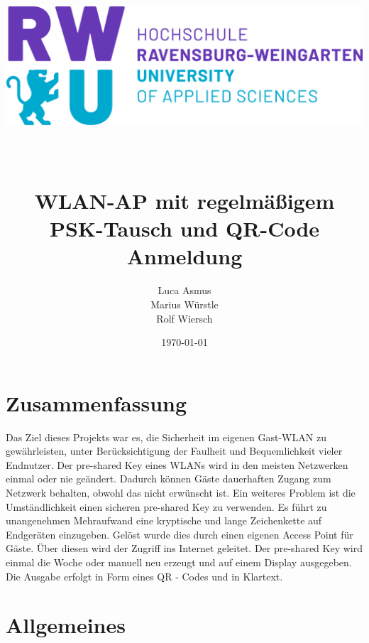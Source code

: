 \documentclass[a4paper,11pt,singlespacing]{article}
\begin{document}
	\setlength{\parindent}{0ex}
	
	\begin{titlepage}
		\author{Luca Asmus\\ Marius Würstle\\Rolf Wiersch}
		\title{\includegraphics[scale=0.3]{rwu_logo_hor-lila-cyan_rgb_0} \\ ~\\ ~\\ WLAN-AP mit regelmäßigem PSK-Tausch und QR-Code Anmeldung \vspace{8cm}}
		\date{\today}
		\maketitle
		\thispagestyle{empty}
    	\end{titlepage}
    	
    	\section{Zusammenfassung}
    	Das Ziel dieses Projekts war es, die Sicherheit im eigenen Gast-WLAN zu gewährleisten, unter Berücksichtigung der Faulheit und Bequemlichkeit vieler Endnutzer. Der pre-shared Key eines WLANs wird in den meisten Netzwerken einmal oder nie geändert. Dadurch können Gäste dauerhaften Zugang zum Netzwerk behalten, obwohl das nicht erwünscht ist. Ein weiteres Problem ist die Umständlichkeit einen sicheren pre-shared Key zu verwenden. Es führt zu unangenehmen Mehraufwand eine kryptische und lange Zeichenkette auf Endgeräten einzugeben. Gelöst wurde dies durch einen eigenen Access Point für Gäste. Über diesen wird der Zugriff ins Internet geleitet. Der pre-shared Key wird einmal die Woche oder manuell neu erzeugt und auf einem Display ausgegeben. Die Ausgabe erfolgt in Form eines QR - Codes und in Klartext.   \\

    	\newpage
    	
    	\tableofcontents
    	\newpage
    	
    	\section{Allgemeines}
    	
\end{document}
